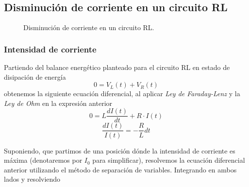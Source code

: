 \documentclass[../main.tex]{subfiles}
\begin{document}
\subsection{Disminución de corriente en un circuito RL}

\begin{figure}[!h]
    \centering
    \caption{Disminución de corriente en un circuito RL.}
    \label{fig::carga_bobina_2}
\end{figure}


\subsubsection{Intensidad de corriente}
\label{part::descarga_inductor1}
Partiendo del balance energético planteado para el circuito RL en estado de disipación de energía
$$0 = V_L(t) + V_R(t)$$
obtenemos la siguiente ecuación diferencial, al aplicar \textit{Ley de Faraday-Lenz} y la \textit{Ley de Ohm} en la expresión anterior
$$0 = L\frac{d I(t)}{d t} + R \cdot I(t)$$
$$\frac{d I(t)}{I(t)} = -\frac{R}{L}d t $$
 
Suponiendo, que partimos de una posición dónde la intensidad de corriente es máxima (denotaremos por $I_0$ para simplificar), resolvemos la ecuación diferencial anterior utilizando el método de separación de variables. Integrando en ambos lados y resolviendo
\end{document}

